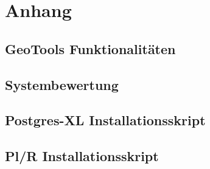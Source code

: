 







\frontmatter												%


\tableofcontents										%

\printglossary[title=Glossar] 			%
\printglossary[type=\acronymtype,title=Abk\"urzungsverzeichnis]	%

\listoffigures											%
\listoftables												%

\mainmatter													%


\appendix
\chapter{Anhang}
%	
\section{GeoTools Funktionalitäten}
	
\newpage
\section{Systembewertung}

\newpage
\section{Postgres-XL Installationsskript}
	
\newpage
\section{Pl/R Installationsskript}

\newpage
